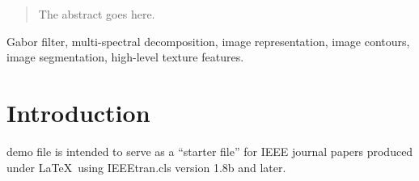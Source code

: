 \documentclass[journal]{IEEEtran}
\begin{document}
% 






\maketitle

\begin{abstract}
The abstract goes here.
\end{abstract}

\begin{IEEEkeywords}
Gabor filter, multi-spectral decomposition, image representation, image contours, image segmentation, high-level texture features.
\end{IEEEkeywords}


%
\IEEEpeerreviewmaketitle



\section{Introduction}
% 
% 
% 
% 
 demo file is intended to serve as a ``starter file''
for IEEE journal papers produced under \LaTeX\ using
IEEEtran.cls version 1.8b and later.
\end{document}
